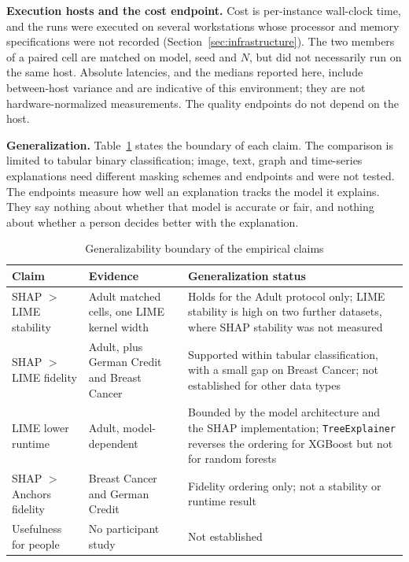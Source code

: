 \documentclass{cleiej}
\begin{document}
\textbf{Execution hosts and the cost endpoint.} Cost is per-instance
wall-clock time, and the runs were executed on several workstations whose
processor and memory specifications were not recorded
(Section~\ref{sec:infrastructure}). The two members of a paired cell are
matched on model, seed and $N$, but did not necessarily run on the same
host. Absolute latencies, and the medians reported here, include
between-host variance and are indicative of this environment; they are not
hardware-normalized measurements. The quality endpoints do not depend on
the host.

\textbf{Generalization.} Table~\ref{tab:generalizability_boundary} states
the boundary of each claim. The comparison is limited to tabular binary
classification; image, text, graph and time-series explanations need
different masking schemes and endpoints and were not tested. The endpoints
measure how well an explanation tracks the model it explains. They say
nothing about whether that model is accurate or fair, and nothing about
whether a person decides better with the explanation.

\begin{table}[htb]
\centering
\caption{Generalizability boundary of the empirical claims}
\label{tab:generalizability_boundary}
\begin{tabularx}{\linewidth}{p{3.0cm} X X}
\toprule
\textbf{Claim} & \textbf{Evidence} & \textbf{Generalization status} \\
\midrule
SHAP $>$ LIME stability & Adult matched cells, one LIME kernel width & Holds for the Adult protocol only; LIME stability is high on two further datasets, where SHAP stability was not measured \\
SHAP $>$ LIME fidelity & Adult, plus German Credit and Breast Cancer & Supported within tabular classification, with a small gap on Breast Cancer; not established for other data types \\
LIME lower runtime & Adult, model-dependent & Bounded by the model architecture and the SHAP implementation; \texttt{TreeExplainer} reverses the ordering for XGBoost but not for random forests \\
SHAP $>$ Anchors fidelity & Breast Cancer and German Credit & Fidelity ordering only; not a stability or runtime result \\
Usefulness for people & No participant study & Not established \\
\bottomrule
\end{tabularx}
\end{table}
\end{document}
